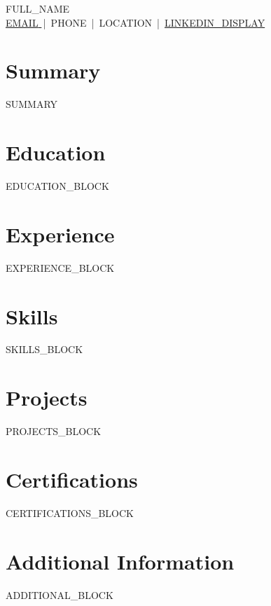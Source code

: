 \documentclass[a4paper,10pt]{article}
\begin{document}
\begin{center}
  {\LARGE\scshape {{FULL_NAME}} }\\[5pt]
  {\small
    \href{mailto:{{EMAIL}}}{ {{EMAIL}} } \,|\, {{PHONE}} \,|\, {{LOCATION}} \,|\,
    \href{ {{LINKEDIN_URL}} }{ {{LINKEDIN_DISPLAY}} }
  }
\end{center}

\section*{Summary}
{{SUMMARY}}

\section*{Education}
{{EDUCATION_BLOCK}}

\section*{Experience}
{{EXPERIENCE_BLOCK}}

\section*{Skills}
{{SKILLS_BLOCK}}

\section*{Projects}
{{PROJECTS_BLOCK}}

\section*{Certifications}
{{CERTIFICATIONS_BLOCK}}

\section*{Additional Information}
{{ADDITIONAL_BLOCK}}
\end{document}
